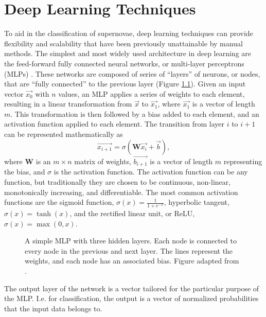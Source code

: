 \chapter{Deep Learning Techniques}
\label{chap:MLTechniques}

To aid in the classification of supernovae, deep learning techniques can provide 
flexibility and scalability that have been previously unattainable by manual 
methods. The simplest and most widely used architecture in deep learning are the feed-forward 
fully connected neural networks, or multi-layer perceptrons (MLPs) \parencite{popescu2009}.
These networks are composed of series of ``layers'' of neurons, or nodes, that 
are ``fully connected'' to the previous layer (Figure \ref{fig:MLP}).
Given an input vector $\vec{x_0}$ with $n$ values, an MLP applies a series of weights to each 
element, resulting in a linear transformation from $\vec{x}$ to $\vec{x_1}$, where
$\vec{x_1}$ is a vector of length $m$. This transformation is then followed by a bias added 
to each element, and an activation function applied to each element.
The transition from layer $i$ to $i+1$ can be represented mathematically as 
\begin{equation}\label{eqn:MLP}
    \vec{x_{i+1}} = \sigma(\mathbf{W}\vec{x_i} + \vec{b}),
\end{equation}
where $\mathbf{W}$ is an $m \times n$ matrix of weights, $\vec{b_{i+1}}$ is a vector of length $m$
representing the bias, and $\sigma$ is the activation function. The activation function can 
be any function, but traditionally they are chosen to be continuous, non-linear, 
monotonically increasing, and differentiable. The most common activation functions 
are the sigmoid function, $\sigma(x) = \frac{1}{1 + e^{-x}}$, hyperbolic tangent, 
$\sigma(x) = \tanh(x)$, and the rectified linear unit, or ReLU,
$\sigma(x) = \max(0, x)$.
\begin{figure}[t]
    \centering
    
    \caption{A simple MLP with three hidden layers. Each node is connected to every 
    node in the previous and next layer. The lines represent the weights, and each 
    node has an associated bias. Figure adapted from \textcite{neutelings2023}.}
    \label{fig:MLP}
\end{figure}
The output layer of the network is a vector tailored for the particular purpose
of the MLP. I.e. for classification, the output is a vector of normalized probabilities 
that the input data belongs to. 

